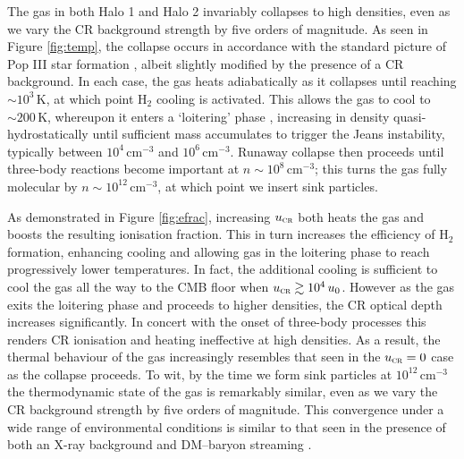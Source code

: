 \documentclass{thesis}
\newcommand{\kelvin}{\ensuremath{\,\mathrm{K}}\xspace}
\newcommand{\cc}{\ensuremath{\,\mathrm{cm}^{-3}}\xspace}
\newcommand{\htwo}{\ensuremath{\mathrm{H}_2}\xspace}
\newcommand{\ucr}{\ensuremath{{u}_{\textsc{cr}}}\xspace}
\begin{document}
The gas in both Halo 1 and Halo 2 invariably collapses to high densities, even as we vary the CR background strength by five orders of magnitude. 
As seen in Figure \ref{fig:temp}, the collapse occurs in accordance with the standard picture of Pop III star formation \citep[e.g.,][]{Greifetal2012,StacyBromm2013,Hiranoetal2014,Hosokawaetal2015}, albeit slightly modified by the presence of a CR background.  
In each case, the gas heats adiabatically as it collapses until reaching $\sim10^3\kelvin$, at which point $\htwo$ cooling is activated.  
This allows the gas to cool to $\sim200\kelvin$, whereupon it enters a `loitering' phase \citep{BrommCoppiLarson2002}, increasing in density quasi-hydrostatically until sufficient mass accumulates to trigger the Jeans instability, typically between $10^4\cc$ and $10^6\cc$. 
Runaway collapse then proceeds until three-body reactions become important at $n\sim10^8\cc$; this turns the gas fully molecular by $n\sim10^{12}\cc$, at which point we insert sink particles.

As demonstrated in Figure \ref{fig:efrac}, increasing $\ucr$ both heats the gas and boosts the resulting ionisation fraction.
This in turn increases the efficiency of $\htwo$ formation, enhancing cooling and allowing gas in the loitering phase to reach progressively lower temperatures. 
In fact, the additional cooling is sufficient to cool the gas all the way to the CMB floor when $\ucr \gtrsim 10^4\,u_0$. 
However as the gas exits the loitering phase and proceeds to higher densities, the CR optical depth increases significantly. 
In concert with the onset of three-body processes this renders CR ionisation and heating ineffective at high densities. 
As a result, the thermal behaviour of the gas increasingly resembles that seen in the $\ucr=0$ case as the collapse proceeds. 
To wit, by the time we form sink particles at  $10^{12}\cc$ the thermodynamic state of the gas is remarkably similar, even as we vary the CR background strength by five orders of magnitude.
This convergence under a wide range of environmental conditions is similar to that seen in the presence of both an X-ray background \citep{Hummeletal2015} and DM--baryon streaming \citep{StacyBrommLoeb2011a,Greifetal2011b}.
\end{document}
